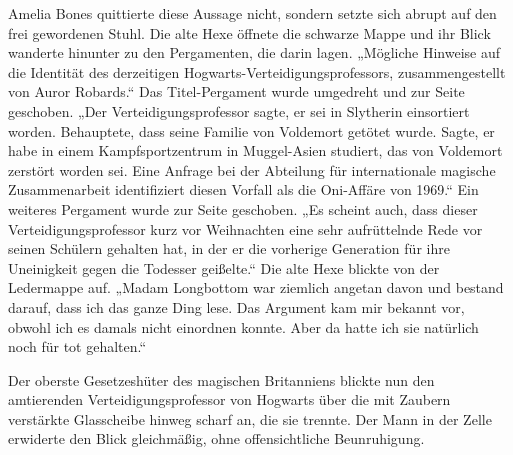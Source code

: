 Amelia Bones quittierte diese Aussage nicht, sondern setzte sich abrupt auf den frei gewordenen Stuhl. Die alte Hexe öffnete die schwarze Mappe und ihr Blick wanderte hinunter zu den Pergamenten, die darin lagen.
„Mögliche Hinweise auf die Identität des derzeitigen Hogwarts-Verteidigungsprofessors, zusammengestellt von Auror Robards.“
Das Titel-Pergament wurde umgedreht und zur Seite geschoben.
„Der Verteidigungsprofessor sagte, er sei in Slytherin einsortiert worden. Behauptete, dass seine Familie von Voldemort getötet wurde. Sagte, er habe in einem Kampfsportzentrum in Muggel-Asien studiert, das von Voldemort zerstört worden sei. Eine Anfrage bei der Abteilung für internationale magische Zusammenarbeit identifiziert diesen Vorfall als die Oni-Affäre von 1969.“
Ein weiteres Pergament wurde zur Seite geschoben.
„Es scheint auch, dass dieser Verteidigungsprofessor kurz vor Weihnachten eine sehr aufrüttelnde Rede vor seinen Schülern gehalten hat, in der er die vorherige Generation für ihre Uneinigkeit gegen die Todesser geißelte.“ Die alte Hexe blickte von der Ledermappe auf.
„Madam Longbottom war ziemlich angetan davon und bestand darauf, dass ich das ganze Ding lese. Das Argument kam mir bekannt vor, obwohl ich es damals nicht einordnen konnte. Aber da hatte ich sie natürlich noch für tot gehalten.“

Der oberste Gesetzeshüter des magischen Britanniens blickte nun den amtierenden Verteidigungsprofessor von Hogwarts über die mit Zaubern verstärkte Glasscheibe hinweg scharf an, die sie trennte. Der Mann in der Zelle erwiderte den Blick gleichmäßig, ohne offensichtliche Beunruhigung.

